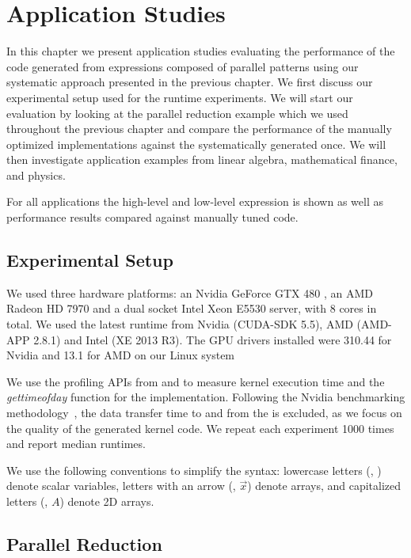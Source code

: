 
\chapter{Application Studies}
\label{ch:sixth} %
\label{chapter:codeGeneration-evaluation}

In this chapter we present application studies evaluating the performance of the \OpenCL code generated from expressions composed of parallel patterns using our systematic approach presented in the previous chapter.
We first discuss our experimental setup used for the runtime experiments.
We will start our evaluation by looking at the parallel reduction example which we used throughout the previous chapter and compare the performance of the manually optimized \OpenCL implementations against the systematically generated once.
We will then investigate application examples from linear algebra, mathematical finance, and physics.

For all applications the high-level and low-level expression is shown as well as performance results compared against manually tuned \OpenCL code.

\section{Experimental Setup}
We used three hardware platforms: an Nvidia GeForce GTX 480 \GPU, an AMD Radeon HD 7970 \GPU and a dual socket Intel Xeon E5530 server, with 8 cores in total.
We used the latest \OpenCL runtime from Nvidia (CUDA-SDK 5.5), AMD (AMD-APP 2.8.1) and Intel (XE 2013 R3).
The GPU drivers installed were 310.44 for Nvidia and 13.1 for AMD on our Linux system 

We use the profiling APIs from \OpenCL and \CUDA to measure kernel execution time and the \textit{gettimeofday} function for the \CPU implementation.
Following the Nvidia benchmarking methodology~\cite{Harris2007}, the data transfer time to and from the \GPU is excluded, as we focus on the quality of the generated \OpenCL kernel code.
We repeat each experiment 1000 times and report median runtimes.

We use the following conventions to simplify the syntax:
lowercase letters (\eg, ) denote scalar variables, letters with an arrow (\eg, $\vec{x}$) denote arrays, and capitalized letters (\eg, $A$) denote 2D arrays.

\section{Parallel Reduction}

